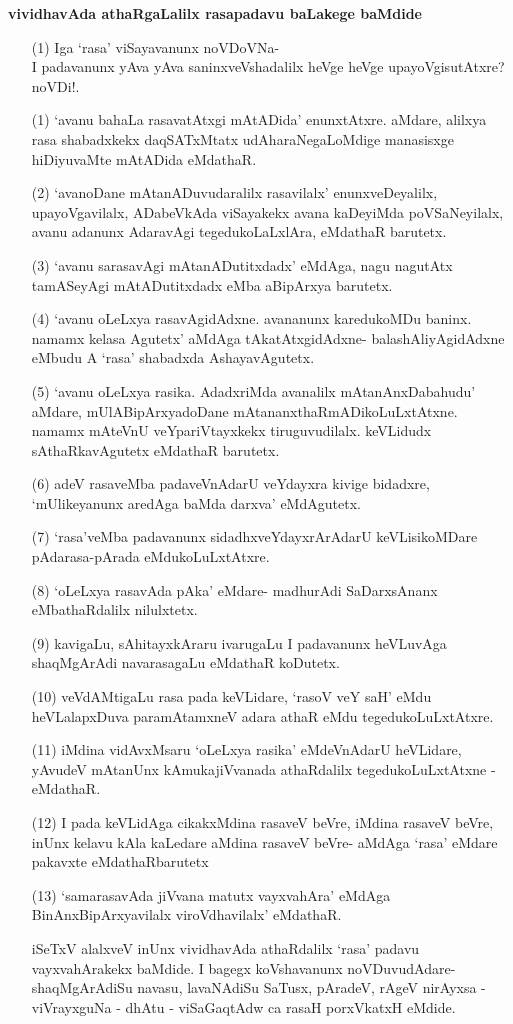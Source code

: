 {\bigskip
\noindent
{\large\bf vividhavAda athaRgaLalilx rasapadavu baLakege baMdide}}\label{page217}

\begin{itemize}
\item[(1)] Iga `rasa' viSayavanunx noVDoVNa-\\
I padavanunx yAva yAva saninxveVshadalilx heVge heVge upayoVgisutAtxre? noVDi!.
\item[(1)] `avanu bahaLa rasavatAtxgi mAtADida' enunxtAtxre. aMdare, alilxya rasa shabadxkekx daqSATxMtatx udAharaNegaLoMdige manasisxge hiDiyuvaMte mAtADida eMdathaR.
\item[(2)] `avanoDane mAtanADuvudaralilx rasavilalx' enunxveDeyalilx, upayoVgavilalx, ADabeVkAda viSayakekx avana kaDeyiMda poVSaNeyilalx, avanu adanunx AdaravAgi tegedukoLaLxlAra, eMdathaR barutetx.
\item[(3)] `avanu sarasavAgi mAtanADutitxdadx' eMdAga, nagu nagutAtx tamASeyAgi mAtADutitxdadx eMba aBipArxya barutetx.
\item[(4)] `avanu oLeLxya rasavAgidAdxne. avananunx karedukoMDu baninx. namamx kelasa Agutetx' aMdAga tAkatAtxgidAdxne- balashAliyAgidAdxne eMbudu A `rasa' shabadxda AshayavAgutetx. 
\item[(5)] `avanu oLeLxya rasika. AdadxriMda avanalilx mAtanAnxDabahudu' aMdare, mUlABipArxyadoDane mAtananxthaRmADikoLuLxtAtxne. namamx mAteVnU veYpariVtayxkekx tiruguvudilalx. keVLidudx sAthaRkavAgutetx eMdathaR barutetx.
\item[(6)] adeV rasaveMba padaveVnAdarU veYdayxra kivige bidadxre, `mUlikeyanunx aredAga baMda darxva' eMdAgutetx.
\item[(7)] `rasa'veMba padavanunx sidadhxveYdayxrArAdarU keVLisikoMDare pAdarasa-pArada eMdukoLuLxtAtxre.
\item[(8)] `oLeLxya rasavAda pAka' eMdare- madhurAdi SaDarxsAnanx eMbathaRdalilx nilulxtetx.
\item[(9)] kavigaLu, sAhitayxkAraru ivarugaLu I padavanunx heVLuvAga shaqMgArAdi navarasagaLu eMdathaR koDutetx.
\item[(10)] veVdAMtigaLu rasa pada keVLidare, `rasoV veY saH'\label{223} eMdu heVLalapxDuva paramAtamxneV adara athaR eMdu tegedukoLuLxtAtxre.
\item[(11)] iMdina vidAvxMsaru `oLeLxya rasika' eMdeVnAdarU heVLidare, yAvudeV mAtanUnx kAmukajiVvanada athaRdalilx tegedukoLuLxtAtxne - eMdathaR.
\item[(12)] I pada keVLidAga cikakxMdina rasaveV beVre, iMdina rasaveV beVre, inUnx kelavu kAla kaLedare aMdina rasaveV beVre- aMdAga `rasa' eMdare pakavxte eMdathaRbarutetx
\item[(13)] `samarasavAda jiVvana matutx vayxvahAra' eMdAga BinAnxBipArxyavilalx viroVdhavilalx' eMdathaR. 

iSeTxV alalxveV inUnx vividhavAda athaRdalilx `rasa' padavu vayxvahArakekx baMdide. I bagegx koVshavanunx noVDuvudAdare- shaqMgArAdiSu navasu\label{218}, lavaNAdiSu SaTusx, pAradeV, rAgeV nirAyxsa - viVrayxguNa - dhAtu - viSaGaqtAdw ca rasaH porxVkatxH eMdide.
\end{itemize}

